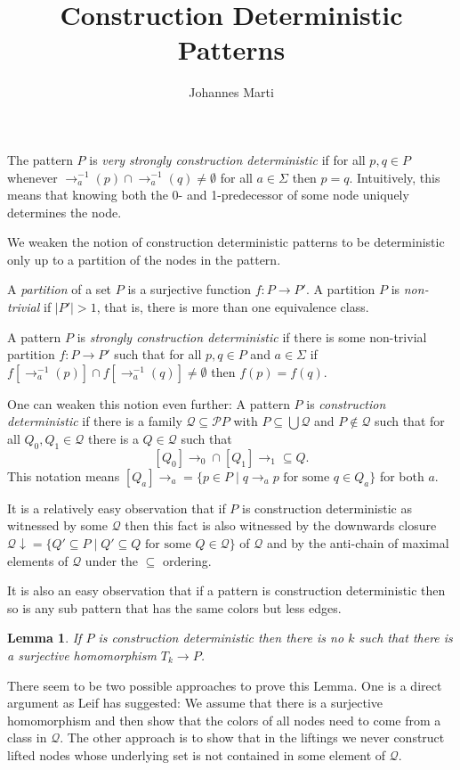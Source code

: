 \documentclass[a4paper]{article}
\title{Construction Deterministic Patterns}
\author{Johannes Marti}
\newcommand{\prearrow}[1]{{\rightarrow_{#1}^{-1}}}
\newcommand{\powerset}{\mathcal{P}}
\newcommand{\Q}{\mathcal{Q}}
\newtheorem{lemma}[theorem]{Lemma}
\begin{document}
\maketitle

\noindent The pattern $P$ is \emph{very strongly construction
deterministic} if for all $p,q \in P$ whenever $\prearrow{a}(p) \cap
\prearrow{a}(q) \neq \emptyset$ for all $a \in \Sigma$ then $p = q$.
Intuitively, this means that knowing both the 0- and 1-predecessor of
some node uniquely determines the node.

We weaken the notion of construction deterministic patterns to be
deterministic only up to a partition of the nodes in the pattern.

A \emph{partition} of a set $P$ is a surjective function $f : P \to P'$.
A partition $P$ is \emph{non-trivial} if $|P'| > 1$, that is, there is
more than one equivalence class.

A pattern $P$ is \emph{strongly construction deterministic} if there is
some non-trivial partition $f : P \to P'$ such that for all $p,q \in P$
and $a \in \Sigma$ if $f[\prearrow{a}(p)] \cap f[\prearrow{a}(q)] \neq
\emptyset$ then $f(p) = f(q)$.

One can weaken this notion even further: A pattern $P$ is
\emph{construction deterministic} if there is a family $\Q \subseteq
\powerset P$ with $P \subseteq \bigcup \Q$ and $P \notin \Q$ such that
for all $Q_0, Q_1 \in \Q$ there is a $Q \in \Q$ such that
\[
 [Q_0]{\rightarrow_0} \cap [Q_1]{\rightarrow_1} \subseteq Q.
\]
This notation means $[Q_a]{\rightarrow_a} = \{p \in P \mid q \rightarrow_a
p \mbox{ for some } q \in Q_a\}$ for both $a$.

It is a relatively easy observation that if $P$ is construction
deterministic as witnessed by some $\Q$ then this fact is also witnessed
by the downwards closure ${\Q\!\downarrow} = \{Q' \subseteq P \mid Q'
\subseteq Q \mbox{ for some } Q \in \Q\}$ of $\Q$ and by the anti-chain
of maximal elements of $\Q$ under the $\subseteq$ ordering.

It is also an easy observation that if a pattern is construction
deterministic then so is any sub pattern that has the same colors but
less edges.

\begin{lemma} \label{killer lemma}
 If $P$ is construction deterministic then there is no $k$ such
that there is a surjective homomorphism $T_k \to P$.
\end{lemma}
There seem to be two possible approaches to prove this Lemma. One is a
direct argument as Leif has suggested: We assume that there is a
surjective homomorphism and then show that the colors of all nodes need
to come from a class in $\Q$. The other approach is to show that in the
liftings we never construct lifted nodes whose underlying set is not
contained in some element of $\Q$.
\end{document}
